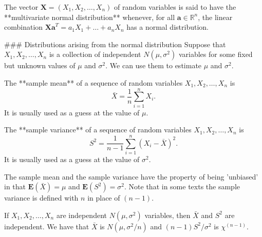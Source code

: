 \begin{definition}
The vector $\mathbf{X}=\left(X_{1}, X_{2}, \dots, X_{n}\right)$ of random variables is said to have the 
**multivariate normal distribution** whenever, for all $\mathbf{a} \in \mathbb{R}^n$, the linear combination $\mathbf{Xa}^T = a_1 X_1 + \dots + a_n X_n$ has a normal distribution.
\end{definition}

### Distributions arising from the normal distribution
Suppose that $X_1, X_2, \dots , X_n$ is a collection 
of independent $N(\mu, \sigma^2)$ variables for some fixed but unknown values of $\mu$ and $\sigma^2$. We can use them to estimate $\mu$ and $\sigma^2$.

\begin{definition}
The **sample mean** of a sequence of random variables $X_1, X_2, \dots , X_n$ is 
\begin{equation*}
    \bar{X} = \frac{1}{n} \sum_{i=1}^n X_i.
\end{equation*}
It is usually used as a guess at the value of $\mu$.
\end{definition}

\begin{definition}
The **sample variance** of a sequence of random variables $X_1, X_2, \dots , X_n$ is 
\begin{equation*}
    S^2 = \frac{1}{n-1}\sum_{i=1}^n (X_i - \bar{X})^2.
\end{equation*}
It is usually used as a guess at the value of $\sigma^2$.
\end{definition}

\begin{remark}
The sample mean and the sample variance have the property of being 'unbiased' in that $\mathbf{E}(\bar{X}) = \mu$ and $\mathbf{E}(S^2) = \sigma^2$. Note that in some texts the sample variance is defined with $n$ in place of $(n - 1)$. 
\end{remark}

\begin{theorem}
If $X_1, X_2, \dots , X_n$ are independent $N(\mu, \sigma^2)$ variables, then $\bar{X}$ and $S^2$ are independent. We have that $\bar{X}$ is $N(\mu, \sigma^2/n)$ and $(n-1)S^2 / \sigma^2$ is $\chi^{(n-1)}$.
\end{theorem}

